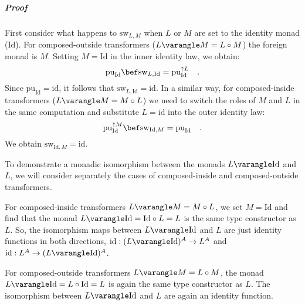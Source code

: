 \subparagraph{Proof}

First consider what happens to $\text{sw}_{L,M}$ when $L$ or $M$
are set to the identity monad ($\text{Id}$). For composed-outside
transformers ($L\varangle M=L\circ M$) the foreign monad is $M$.
Setting $M=\text{Id}$ in the inner identity law, we obtain: 
\[
\text{pu}_{\text{Id}}\bef\text{sw}_{L,\text{Id}}=\text{pu}_{\text{Id}}^{\uparrow L}\quad.
\]
Since $\text{pu}_{\text{Id}}=\text{id}$, it follows that $\text{sw}_{L,\text{Id}}=\text{id}$.
In a similar way, for composed-inside transformers ($L\varangle M=M\circ L$)
we need to switch the roles of $M$ and $L$ in the same computation
and substitute $L=\text{id}$ into the outer identity law:
\[
\text{pu}_{\text{Id}}^{\uparrow M}\bef\text{sw}_{\text{Id},M}=\text{pu}_{\text{Id}}\quad.
\]
We obtain $\text{sw}_{\text{Id},M}=\text{id}$.

\begin{comment}
Note that $\text{sw}_{L,\text{Id}}:L^{A}\rightarrow L^{A}$ is a natural
transformation for a monad $L$, so one may heuristically expect $\text{sw}_{L,\text{Id}}$
to be equal to the identity map (the only natural transformation $L^{A}\rightarrow L^{A}$
that exists for all monads $L$). Similarly, one may expect that $\text{sw}_{\text{Id},M}:M^{A}\rightarrow M^{A}=\text{id}$
since it is a natural transformation. But these are only heuristic
expectations, while we have just shown that the properties $\text{sw}_{L,\text{Id}}=\text{id}$
and $\text{sw}_{\text{Id},M}=\text{id}$ follow from the previously
established laws of \lstinline!swap! without any new assumptions.
These properties will be needed in the proofs below. 
\end{comment}
To demonstrate a monadic isomorphism between the monads $L\varangle\text{Id}$
and $L$, we will consider separately the cases of composed-inside
and composed-outside transformers.

For composed-inside transformers $L\varangle M=M\circ L$, we set
$M=\text{Id}$ and find that the monad $L\varangle\text{Id}=\text{Id}\circ L=L$
is the same type constructor as $L$. So, the isomorphism maps between
$L\varangle\text{Id}$ and $L$ are just identity functions in both
directions, $\text{id}:(L\varangle\text{Id})^{A}\rightarrow L^{A}$
and $\text{id}:L^{A}\rightarrow(L\varangle\text{Id})^{A}$. 

For composed-outside transformers $L\varangle M=L\circ M$, the monad
$L\varangle\text{Id}=L\circ\text{Id}=L$ is again the same type constructor
as $L$. The isomorphism between $L\varangle\text{Id}$ and $L$ are
again an identity function.

